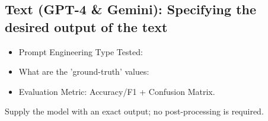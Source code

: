 \subsection{Text (GPT-4 \& Gemini): Specifying the desired output of the text}

\begin{itemize}
    \item Prompt Engineering Type Tested:
    \item What are the 'ground-truth' values:
    \item Evaluation Metric: Accuracy/F1 + Confusion Matrix.
\end{itemize}

Supply the model with an exact output; no post-processing is required.

